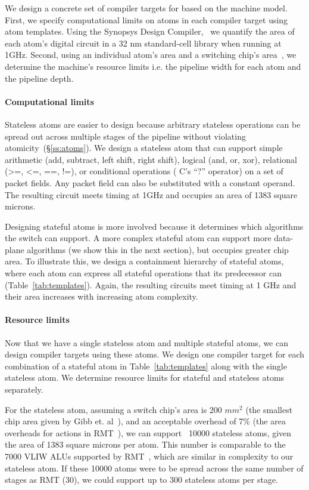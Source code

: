 We design a concrete set of compiler targets for \pktlanguage based on the
\absmachine machine model. First, we specify computational limits on atoms in
each compiler target using atom templates. Using the Synopsys Design
Compiler,~\cite{synopsys_dc} we quantify the area of each atom's digital
circuit in a 32 nm standard-cell library when running at 1GHz.  Second, using
an individual atom's area and a switching chip's area~\cite{gibb_parsing}, we
determine the machine's resource limits i.e. the pipeline width for each atom
and the pipeline depth.

\paragraph{Computational limits}
Stateless atoms are easier to design because arbitrary stateless operations can
be spread out across multiple stages of the pipeline without violating
atomicity~(\S\ref{ss:atoms}). We design a stateless atom that can support
simple arithmetic (add, subtract, left shift, right shift), logical (and, or,
xor), relational (>=, <=, ==, !=), or conditional operations ( C's ``?''
operator) on a set of packet fields. Any packet field can also be substituted
with a constant operand. The resulting circuit meets timing at 1GHz and
occupies an area of 1383 square microns.

Designing stateful atoms is more involved because it determines which
algorithms the switch can support. A more complex stateful atom can support
more data-plane algorithms (we show this in the next section), but occupies
greater chip area. To illustrate this, we design a containment hierarchy of
stateful atoms, where each atom can express all stateful operations that its
predecessor can (Table~\ref{tab:templates}). Again, the resulting circuits meet
timing at 1 GHz and their area increases with increasing atom complexity.

\paragraph{Resource limits}
Now that we have a single stateless atom and multiple stateful atoms, we can
design compiler targets using these atoms.  We design one compiler target for
each combination of a stateful atom in Table~\ref{tab:templates} along with the
single stateless atom. We determine resource limits for stateful and stateless
atoms separately.

For the stateless atom, assuming a switch chip's area is 200 $mm^2$ (the
smallest chip area given by Gibb et. al~\cite{gibb_parsing}), and an acceptable
overhead of 7\% (the area overheads for actions in RMT~\cite{rmt}), we can
support ~10000 stateless atoms, given the area of 1383 square microns per atom.
This number is comparable to the 7000 VLIW ALUs supported by RMT~\cite{rmt},
which are similar in complexity to our stateless atom. If these 10000 atoms
were to be spread across the same number of stages as RMT (30), we could
support up to 300 stateless atoms per stage.

